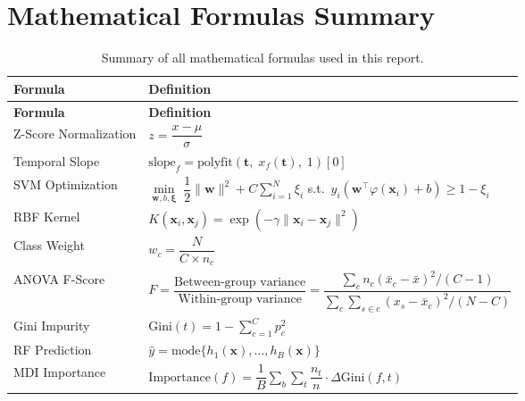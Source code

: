 \documentclass[12pt,a4paper]{article}
\begin{document}
\section{Mathematical Formulas Summary}
\label{sec:formulas}

\begin{longtable}{p{3.5cm}p{9.5cm}}
\caption{Summary of all mathematical formulas used in this report.} \label{tab:formulas} \\
\toprule
\textbf{Formula} & \textbf{Definition} \\
\midrule
\endfirsthead
\toprule
\textbf{Formula} & \textbf{Definition} \\
\midrule
\endhead
\midrule
\endfoot
\bottomrule
\endlastfoot

Z-Score Normalization &
$z = \dfrac{x - \mu}{\sigma}$ \\[0.8em]

Temporal Slope &
$\text{slope}_f = \text{polyfit}(\mathbf{t},\; x_f(\mathbf{t}),\; 1)[0]$ \\[0.8em]

SVM Optimization &
$\min\limits_{\mathbf{w},b,\boldsymbol{\xi}} \;\dfrac{1}{2}\|\mathbf{w}\|^2 + C\sum\limits_{i=1}^{N}\xi_i$ \quad s.t.\ $y_i(\mathbf{w}^\top\varphi(\mathbf{x}_i)+b) \geq 1-\xi_i$ \\[0.8em]

RBF Kernel &
$K(\mathbf{x}_i, \mathbf{x}_j) = \exp(-\gamma\|\mathbf{x}_i - \mathbf{x}_j\|^2)$ \\[0.8em]

Class Weight &
$w_c = \dfrac{N}{C \times n_c}$ \\[0.8em]

ANOVA F-Score &
$F = \dfrac{\text{Between-group variance}}{\text{Within-group variance}} = \dfrac{\sum_{c} n_c(\bar{x}_c - \bar{x})^2/(C-1)}{\sum_{c}\sum_{s \in c}(x_s - \bar{x}_c)^2/(N-C)}$ \\[0.8em]

Gini Impurity &
$\text{Gini}(t) = 1 - \sum\limits_{c=1}^{C} p_c^2$ \\[0.8em]

RF Prediction &
$\hat{y} = \text{mode}\{h_1(\mathbf{x}), \ldots, h_B(\mathbf{x})\}$ \\[0.8em]

MDI Importance &
$\text{Importance}(f) = \dfrac{1}{B}\sum\limits_{b}\sum\limits_{t} \dfrac{n_t}{n}\cdot\Delta\text{Gini}(f,t)$ \\[0.8em]


\end{longtable}
\end{document}
